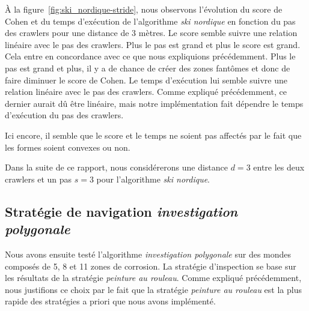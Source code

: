 \documentclass[francais,RandD]{rapportPFE}
\begin{document}
			À la figure~\ref{fig:ski_nordique-stride}, nous observons l'évolution du score de Cohen et du temps d'exécution de l'algorithme \textit{ski nordique} en fonction du pas des crawlers pour une distance de 3 mètres.
			Le score semble suivre une relation linéaire avec le pas des crawlers.
			Plus le pas est grand et plus le score est grand.
			Cela entre en concordance avec ce que nous expliquions précédemment.
			Plus le pas est grand et plus, il y a de chance de créer des zones fantômes et donc de faire diminuer le score de Cohen.
			Le temps d'exécution lui semble suivre une relation linéaire avec le pas des crawlers.
			Comme expliqué précédemment, ce dernier aurait dû être linéaire, mais notre implémentation fait dépendre le temps d'exécution du pas des crawlers.

			Ici encore, il semble que le score et le temps ne soient pas affectés par le fait que les formes soient convexes ou non.

			Dans la suite de ce rapport, nous considérerons une distance $d = 3$ entre les deux crawlers et un pas $s = 3$ pour l'algorithme \textit{ski nordique}.
		\subsection*{Stratégie de navigation \textit{investigation polygonale}}
			Nous avons ensuite testé l'algorithme \textit{investigation polygonale} sur des mondes composés de 5, 8 et 11 zones de corrosion.
			La stratégie d'inspection se base sur les résultats de la stratégie \textit{peinture au rouleau}.
			Comme expliqué précédemment, nous justifions ce choix par le fait que la stratégie \textit{peinture au rouleau} est la plus rapide des stratégies a priori que nous avons implémenté.
\end{document}

